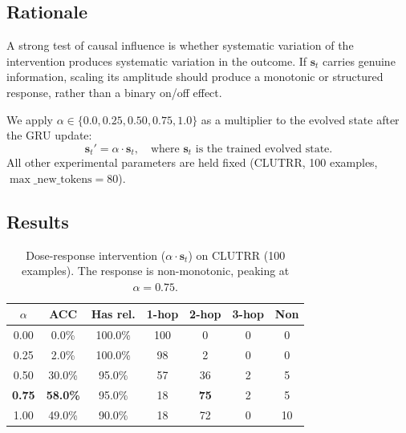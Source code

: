 \documentclass[11pt,a4paper]{article}
\begin{document}
\subsection{Rationale}

A strong test of causal influence is whether systematic variation of the intervention produces systematic variation in the outcome. If $\mathbf{s}_t$ carries genuine information, scaling its amplitude should produce a monotonic or structured response, rather than a binary on/off effect.

We apply $\alpha \in \{0.0, 0.25, 0.50, 0.75, 1.0\}$ as a multiplier to the evolved state after the GRU update:
\begin{equation}
    \mathbf{s}_t' = \alpha \cdot \mathbf{s}_t,\quad \text{where } \mathbf{s}_t \text{ is the trained evolved state.}\label{eq:dose}
\end{equation}
All other experimental parameters are held fixed (CLUTRR, 100 examples, $\max\_\text{new\_tokens} = 80$).

\subsection{Results}

\begin{table}[t]
\centering
\caption{Dose-response intervention ($\alpha \cdot \mathbf{s}_t$) on CLUTRR (100 examples). The response is non-monotonic, peaking at $\alpha = 0.75$.}
\label{tab:dose}
\begin{tabular}{@{}ccccccc@{}}
\toprule
$\alpha$ & ACC & Has rel. & 1-hop & 2-hop & 3-hop & Non \\
\midrule
0.00 & 0.0\% & 100.0\% & 100 & 0 & 0 & 0 \\
0.25 & 2.0\% & 100.0\% & 98 & 2 & 0 & 0 \\
0.50 & 30.0\% & 95.0\% & 57 & 36 & 2 & 5 \\
\textbf{0.75} & \textbf{58.0\%} & 95.0\% & 18 & \textbf{75} & 2 & 5 \\
1.00 & 49.0\% & 90.0\% & 18 & 72 & 0 & 10 \\
\bottomrule
\end{tabular}
\end{table}
\end{document}
